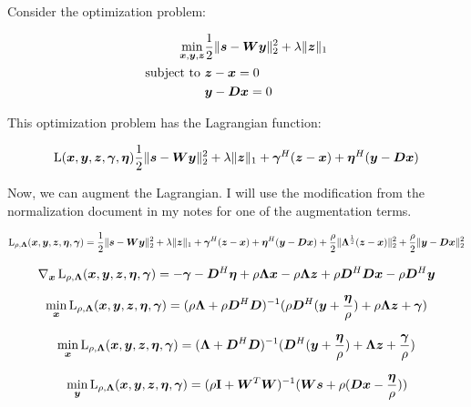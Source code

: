 \documentclass{article}
\begin{document}
Consider the optimization problem:

\begin{equation}
\begin{aligned}
\min_{\bm{x},\bm{y},\bm{z}} & \frac{1}{2}\|\bm{s} - \bm{W}\bm{y}\|_2^2 + \lambda\|\bm{z}\|_1 \\
\text{subject to } & \bm{z} - \bm{x} = 0 \\
                   & \bm{y} -\bm{D}\bm{x} = 0
\end{aligned}
\end{equation}

This optimization problem has the Lagrangian function:

\begin{equation}
\operatorname{L}(\bm{x},\bm{y},\bm{z},\bm{\gamma},\bm{\eta}) \frac{1}{2}\|\bm{s} - \bm{W}\bm{y}\|_2^2 + \lambda\|\bm{z}\|_1 + \bm{\gamma}^H(\bm{z} - \bm{x}) + \bm{\eta}^H(\bm{y} - \bm{D}\bm{x})
\end{equation}

Now, we can augment the Lagrangian. I will use the modification from the normalization document in my notes for one of the augmentation terms.

\begin{equation}
\operatorname{L}_{\rho,\bm{\Lambda}}(\bm{x},\bm{y},\bm{z},\bm{\eta},\bm{\gamma}) = \frac{1}{2}\|\bm{s} - \bm{W}\bm{y}\|_2^2 + \lambda\|\bm{z}\|_1 + \bm{\gamma}^H(\bm{z} - \bm{x}) + \bm{\eta}^H(\bm{y} - \bm{D}\bm{x}) + \frac{\rho}{2}\|\bm{\Lambda}^{\frac{1}{2}}(\bm{z} - \bm{x})\|_2^2 + \frac{\rho}{2}\|\bm{y} - \bm{D}\bm{x}\|_2^2
\end{equation}

\begin{equation}
\nabla_{\bm{x}}\operatorname{L}_{\rho,\bm{\Lambda}}(\bm{x},\bm{y},\bm{z},\bm{\eta},\bm{\gamma}) = -\bm{\gamma} - \bm{D}^H\bm{\eta} + \rho\bm{\Lambda}\bm{x} - \rho\bm{\Lambda}\bm{z} + \rho\bm{D}^H\bm{D}\bm{x} - \rho\bm{D}^H\bm{y}
\end{equation}

\begin{equation}
\min_{\bm{x}} \operatorname{L}_{\rho,\bm{\Lambda}}(\bm{x},\bm{y},\bm{z},\bm{\eta},\bm{\gamma}) = (\rho\bm{\Lambda} + \rho\bm{D}^H\bm{D})^{-1}(\rho\bm{D}^H(\bm{y} + \frac{\bm{\eta}}{\rho}) + \rho\bm{\Lambda}\bm{z} + \bm{\gamma})
\end{equation}

\begin{equation}
\min_{\bm{x}} \operatorname{L}_{\rho,\bm{\Lambda}}(\bm{x},\bm{y},\bm{z},\bm{\eta},\bm{\gamma}) = (\bm{\Lambda} + \bm{D}^H\bm{D})^{-1}(\bm{D}^H(\bm{y} + \frac{\bm{\eta}}{\rho}) + \bm{\Lambda}\bm{z} + \frac{\bm{\gamma}}{\rho})
\end{equation}

\begin{equation}
\min_{\bm{y}} \operatorname{L}_{\rho,\bm{\Lambda}}(\bm{x},\bm{y},\bm{z},\bm{\eta},\bm{\gamma}) = (\rho{\bf I} + \bm{W}^T\bm{W})^{-1}(\bm{W}\bm{s} + \rho(\bm{D}\bm{x} - \frac{\bm{\eta}}{\rho}))
\end{equation}
\end{document}
